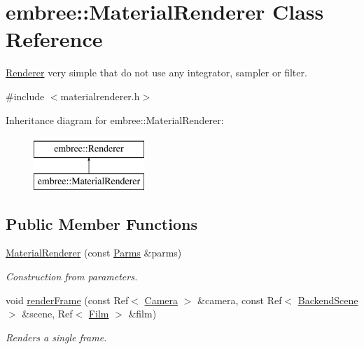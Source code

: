 \hypertarget{classembree_1_1_material_renderer}{
\section{embree::MaterialRenderer Class Reference}
\label{classembree_1_1_material_renderer}
}


\hyperlink{classembree_1_1_renderer}{Renderer} very simple that do not use any integrator, sampler or filter.  




{\ttfamily \#include $<$materialrenderer.h$>$}

Inheritance diagram for embree::MaterialRenderer:\begin{figure}[H]
\begin{center}
\leavevmode
\includegraphics[height=2.000000cm]{classembree_1_1_material_renderer}
\end{center}
\end{figure}
\subsection*{Public Member Functions}
\begin{DoxyCompactItemize}
\item 
\hyperlink{classembree_1_1_material_renderer_a84296d4fd6ae8edfddbc73a5fc5af8af}{MaterialRenderer} (const \hyperlink{classembree_1_1_parms}{Parms} \&parms)
\begin{DoxyCompactList}\small\item\em Construction from parameters. \item\end{DoxyCompactList}\item 
void \hyperlink{classembree_1_1_material_renderer_a0323dad0c9e38127460ea8f4651d5fbc}{renderFrame} (const Ref$<$ \hyperlink{classembree_1_1_camera}{Camera} $>$ \&camera, const Ref$<$ \hyperlink{classembree_1_1_backend_scene}{BackendScene} $>$ \&scene, Ref$<$ \hyperlink{classembree_1_1_film}{Film} $>$ \&film)
\begin{DoxyCompactList}\small\item\em Renders a single frame. \item\end{DoxyCompactList}\end{DoxyCompactItemize}


